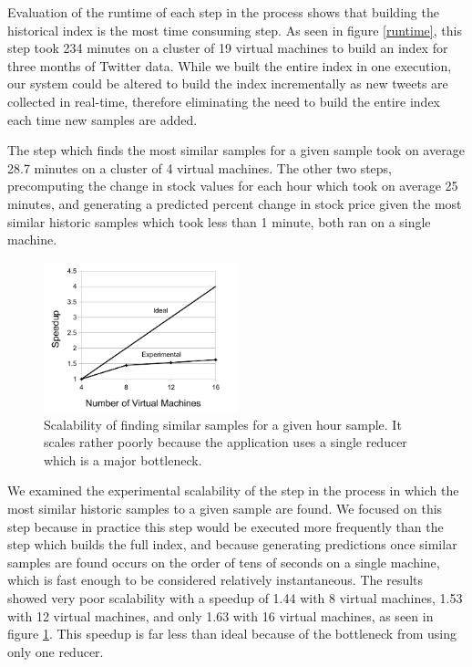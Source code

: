 \documentclass[twocolumn]{article}
\begin{document}
Evaluation of the runtime of each step in the process shows that building the historical index is the most time consuming step. As seen in figure \ref{runtime}, this step took 234 minutes on a cluster of 19 virtual machines to build an index for three months of Twitter data. While we built the entire index in one execution, our system could be altered to build the index incrementally as new tweets are collected in real-time, therefore eliminating the need to build the entire index each time new samples are added.

The step which finds the most similar samples for a given sample took on average 28.7 minutes on a cluster of 4 virtual machines. The other two steps, precomputing the change in stock values for each hour which took on average 25 minutes, and generating a predicted percent change in stock price given the most similar historic samples which took less than 1 minute, both ran on a single machine.

\begin{figure}
\centering
\includegraphics[width=0.5\textwidth]{speedup}
\caption{Scalability of finding similar samples for a given hour sample. It scales rather poorly because the application uses a single reducer which is a major bottleneck.}
\label{speedup}
\end{figure}

We examined the experimental scalability of the step in the process in which the most similar historic samples to a given sample are found. We focused on this step because in practice this step would be executed more frequently than the step which builds the full index, and because generating predictions once similar samples are found occurs on the order of tens of seconds on a single machine, which is fast enough to be considered relatively instantaneous. The results showed very poor scalability with a speedup of 1.44 with 8 virtual machines, 1.53 with 12 virtual machines, and only 1.63 with 16 virtual machines, as seen in figure \ref{speedup}. This speedup is far less than ideal because of the bottleneck from using only one reducer.
\end{document}
